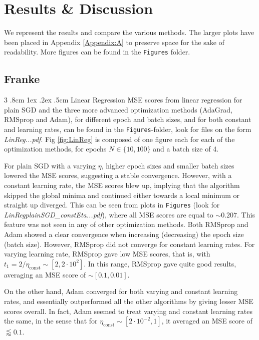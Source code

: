 \documentclass[%
reprint,s
amsmath,amssymb,
aps,
]{revtex4-2}
\makeatletter
\renewcommand{\subsubsection}{%
	\@startsection
	{subsubsection}%
	{3}%
	{\z@}%
	{.8cm \@plus1ex \@minus .2ex}%
	{.5cm}%
	{\normalfont\small\centering}%
}
\makeatother
\begin{document}
\section{Results \& Discussion}
We represent the results and compare the various methods. The larger plots have been placed in Appendix \ref{Appendix:A} to preserve space for the sake of readability. More figures can be found in the \texttt{Figures} folder.

\subsection{Franke}
\subsubsection{Linear Regression}
MSE scores from linear regression for plain SGD and the three more advanced optimization methods (AdaGrad, RMSprop and Adam), for different epoch and batch sizes, and for both constant and learning rates, can be found in the \texttt{Figures}-folder, look for files on the form \emph{LinReg...pdf}. Fig \ref{fig:LinReg} is composed of one figure each for each of the optimization methods, for epochs \(N\in\{10, 100\}\) and a batch size of 4. 

For plain SGD with a varying \(\eta\), higher epoch sizes and smaller batch sizes lowered the MSE scores, suggesting a stable convergence. However, with a constant learning rate, the MSE scores blew up, implying that the algorithm skipped the global minima and continued either towards a local minimum or straight up diverged. This can be seen from plots in \texttt{Figures} (look for \emph{LinRegplainSGD\_constEta...pdf}), where all MSE scores are equal to \(\sim 0.207\). This feature was not seen in any of other optimization methods. Both RMSprop and Adam showed a clear convergence when increasing (decreasing) the epoch size (batch size). However, RMSprop did not converge for constant learning rates. For varying learning rate, RMSprop gave low MSE scores, that is, with \(t_{1} = 2/\eta_{\text{const}}\sim [2, 2\cdot 10^{2}]\). In this range, RMSprop gave quite good results, averaging an MSE score of \(\sim [0.1, 0.01]\). 

On the other hand, Adam converged for both varying and constant learning rates, and essentially outperformed all the other algorithms by giving lesser MSE scores overall. In fact, Adam seemed to treat varying and constant learning rates the same, in the sense that for \(\eta_{\text{const}}\sim[2\cdot10^{-2}, 1]\), it averaged an MSE score of \(\lessapprox 0.1\).
\end{document}
